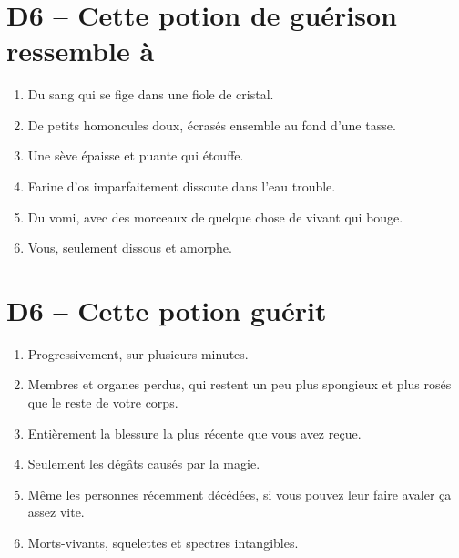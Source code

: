 \documentclass{article}
\begin{document}
\title{\vspace{-0.5cm}{\Huge One-Roll Healing Potions} \vspace{-1cm}}

\date{}

\maketitle



\section*{D6 -- Cette potion de guérison ressemble à}
\begin{enumerate}
	\item Du sang qui se fige dans une fiole de cristal.
	\item De petits homoncules doux, écrasés ensemble au fond d'une tasse.
	\item Une sève épaisse et puante qui étouffe.
	\item Farine d'os imparfaitement dissoute dans l'eau trouble.
	\item Du vomi, avec des morceaux de quelque chose de vivant qui bouge.
	\item Vous, seulement dissous et amorphe.
\end{enumerate}

\section*{D6 -- Cette potion guérit}
\begin{enumerate}
	\item Progressivement, sur plusieurs minutes.
	\item Membres et organes perdus, qui restent un peu plus spongieux et plus rosés que le reste de votre corps.
	\item Entièrement la blessure la plus récente que vous avez reçue.
	\item Seulement les dégâts causés par la magie.
	\item Même les personnes récemment décédées, si vous pouvez leur faire avaler ça assez vite.
	\item Morts-vivants, squelettes et spectres intangibles.
\end{enumerate}
\end{document}
